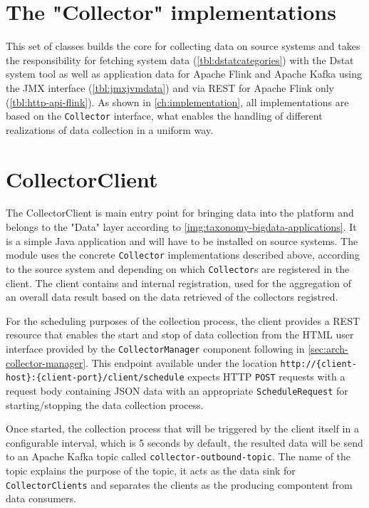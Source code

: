 \section{The "Collector" implementations}

This set of classes builds the core for collecting data on source systems and takes the responsibility for fetching
system data (\autoref{tbl:dstatcategories}) with the Dstat system tool as well as application data for Apache Flink
and Apache Kafka using the JMX interface (\autoref{tbl:jmxjvmdata}) and via REST for Apache Flink only
(\autoref{tbl:http-api-flink}). As shown in \autoref{ch:implementation}, all implementations are based on the
\verb|Collector| interface, what enables the handling of different realizations of data collection in a uniform way.

\section{CollectorClient}

The CollectorClient is main entry point for bringing data into the platform and belongs to the "Data" layer according to
\autoref{img:taxonomy-bigdata-applications}. It is a simple Java application and will have to be installed on source systems.
The module uses the concrete \verb|Collector| implementations described above, according to the source system and
depending on which \verb|Collector|s are registered in the client. The client contains and internal registration, used for the
aggregation of an overall data result based on the data retrieved of the collectors registred.

For the scheduling purposes of the collection process, the client provides a REST resource that enables the start and stop of data
collection from the HTML user interface provided by the \verb|CollectorManager| component following in \autoref{sec:arch-collector-manager}.
This endpoint available under the location \verb|http://{client-host}:{client-port}/client/schedule| expects HTTP \verb|POST| requests
with a request body containing JSON data with an appropriate \verb|ScheduleRequest| for starting/stopping the data collection process.

Once started, the collection process that will be triggered by the client itself in a configurable interval, which is 5 seconds by default,
the resulted data will be send to an Apache Kafka topic called \verb|collector-outbound-topic|. The name of the topic explains the
purpose of the topic, it acts as the data sink for \verb|CollectorClients| and separates the clients as the producing compontent
from data consumers.

